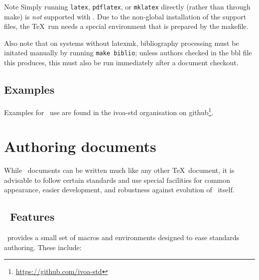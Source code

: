 \documentclass[11pt,a4paper]{ivoa}
\begin{document}
\begin{admonition}{Note}
Simply running \texttt{latex}, \texttt{pdflatex},
or \texttt{mklatex} directly
(rather than through make) is \emph{not} supported with \ivoatex.  Due
to the non-global installation of the support files, the \TeX\ run needs
a special environment that is prepared by the makefile.

Also note that on systems without latexmk,
bibliography processing must be initated manually by
running \texttt{make biblio}; unless authors checked in the bbl file
this produces, this must also be run immediately after a document checkout.
\end{admonition}

\subsection{Examples}

Examples for \ivoatex\ use are found in the ivoa-std organisation on
github\footnote{\url{https://github.com/ivoa-std}}.


\section{Authoring documents}
\label{sect:authoring}

While \ivoatex\ documents can be written much like any other \TeX\
document, it is advisable to follow certain standards and use special
facilities for common appearance, easier development, and robustness
against evolution of \ivoatex\ itself.

\subsection{\ivoatex\ Features}

\ivoatex\ provides a small set of macros and environments designed
to ease standards authoring.  These include:
\end{document}
